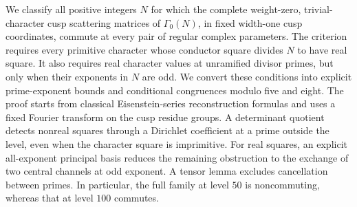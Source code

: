 We classify all positive integers \(N\) for which the complete
weight-zero, trivial-character cusp scattering matrices of
\(\Gamma_0(N)\), in fixed width-one cusp coordinates, commute at every
pair of regular complex parameters. The criterion requires every primitive
character whose conductor square divides \(N\) to have real square.
It also requires real character values at unramified divisor primes,
but only when their exponents in \(N\) are odd. We convert these conditions
into explicit prime-exponent bounds and conditional congruences modulo
five and eight. The proof starts from classical Eisenstein-series
reconstruction formulas and uses a fixed Fourier transform on the cusp
residue groups. A determinant quotient detects nonreal squares through
a Dirichlet coefficient at a prime outside the level, even when the
character square is imprimitive. For real squares, an explicit
all-exponent principal basis reduces the remaining obstruction to the
exchange of two central channels at odd exponent. A tensor lemma
excludes cancellation between primes. In particular, the full family
at level \(50\) is noncommuting, whereas that at level \(100\) commutes.
